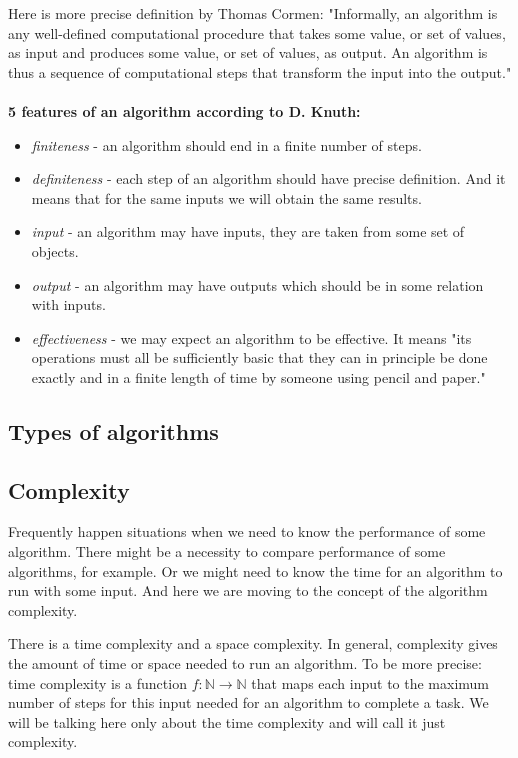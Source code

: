 \documentclass[
  field=inf,
  biblatex,
  language=english,
  glossaries,
  theorems=false,
  index
]{kidiplom}
\begin{document}
Here is more precise definition by Thomas Cormen: "Informally, an algorithm is any well-defined computational procedure that takes some value, or set of values, as input and produces some value, or set of values, as output. An algorithm is thus a sequence of computational steps that transform the input into the output." \cite{cormen}
\\\\
\textbf{5 features of an algorithm according to D. Knuth\cite{knuth1}:}
\begin{itemize}
	\item \textit{finiteness} - an algorithm should end in a finite number of steps.
	\item \textit{definiteness} - each step of an algorithm should have precise definition. And it means that for the same inputs we will obtain the same results.
	\item \textit{input} - an algorithm may have inputs, they are taken from some set of objects.
	\item \textit{output} - an algorithm may have outputs which should be in some relation with inputs.
	\item \textit{effectiveness} - we may expect an algorithm to be effective. It means "its operations must all be sufficiently basic that they can in principle be done exactly and in a finite length of time by someone using pencil and paper."\cite{knuth1}
\end{itemize}

\subsection{Types of algorithms}

\subsection{Complexity}

Frequently happen situations when we need to know the performance of some algorithm. There might be a necessity to compare performance of some algorithms, for example. Or we might need to know the time for an algorithm to run with some input. And here we are moving to the concept of the algorithm complexity.

There is a time complexity and a space complexity. In general, complexity gives the amount of time or space needed to run an algorithm. To be more precise: time complexity is a function $f:\mathbb{N}\to\mathbb{N}$ that maps each input to the maximum number of steps for this input needed for an algorithm to complete a task. We will be talking here only about the time complexity and will call it just complexity.
\end{document}
